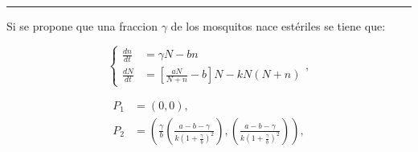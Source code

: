 \documentclass[twocolumn,aps,prl]{revtex4-1}
\newcommand*\sepline{%
  \begin{center}
    \rule[1ex]{.5\textwidth}{.5pt}
  \end{center}}
\newcommand{\tusa}{ \frac{a-b-\gamma}{k(1+\frac{\gamma}{b})^2} }
\begin{document}

\sepline

Si se propone que una fraccion $\gamma$ de los mosquitos nace estériles se tiene que:

\begin{equation}
    \left\lbrace
    \begin{aligned}
        \frac{d n}{d t}&=  \gamma N - b n
        \\
        \frac{d N}{d t}&=\left[\frac{a N}{N+n}-b\right] N- k N(N+n) 
    \end{aligned}
    \right. ,
\end{equation}


$$
\begin{aligned}
    P_1 &= (0, 0) ,\\
    P_2 &= \left( \frac{\gamma}{b} \left( \tusa \right), \left( \tusa \right) \right), \\ 
\end{aligned}
$$





\end{document}
